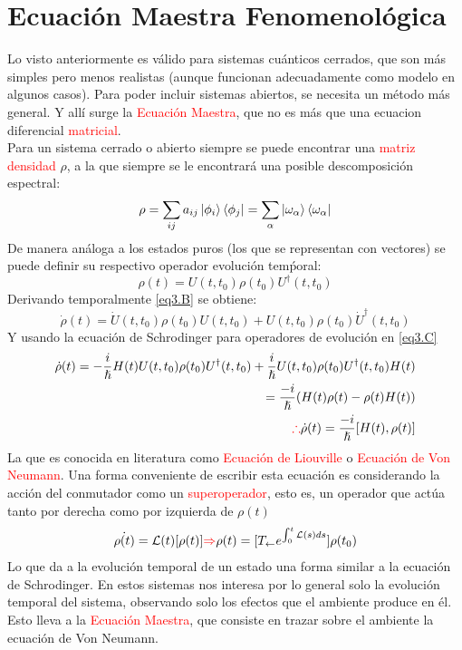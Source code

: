 \documentclass{book}
\begin{document}
\chapter{Ecuación Maestra Fenomenológica}
Lo visto anteriormente es válido para sistemas cuánticos cerrados, que son más simples pero menos realistas (aunque funcionan adecuadamente como modelo en algunos casos). Para poder incluir sistemas abiertos, se necesita un método más general. Y allí surge la \textcolor{red}{Ecuación Maestra}, que no es más que una ecuacion diferencial  \textcolor{red}{matricial}.\\

Para un sistema cerrado o abierto siempre se puede encontrar una \textcolor{red}{matriz densidad} $\rho$, a la que siempre se le encontrará una posible descomposición espectral:
\begin{equation}\label{eq3.A}\rho=\sum_{ij}a_{ij}\ket{\phi_i}\bra{\phi_j}=\sum_\alpha \ket{\omega_\alpha}\bra{\omega_\alpha}\end{equation}
De manera análoga a los estados puros (los que se representan con vectores) se puede definir su respectivo operador evolución temṕoral:
\begin{equation}\label{eq3.B}\rho(t)=U(t,t_0)\rho(t_0)U^\dag(t,t_0)\end{equation}
Derivando temporalmente \ref{eq3.B} se obtiene:
\begin{equation}\label{eq3.C}\dot{\rho}(t)=\dot{U}(t,t_0)\rho(t_0)U(t,t_0)+U(t,t_0)\rho(t_0)\dot{U}^\dag(t,t_0)\end{equation}
Y usando la ecuación de Schrodinger para operadores de evolución en \ref{eq3.C}
\begin{equation}\label{eq3.D}\begin{aligned}\dot{\rho}(t)=-\frac{i}{\hslash} H(t)U(t,t_0)\rho(t_0)U^\dag(t,t_0)+\frac{i}{\hslash} U(t,t_0)\rho(t_0)U^\dag(t,t_0)H(t)\\ = \frac{-i}{\hslash}(H(t)\rho(t)-\rho(t)H(t)) \\ \textcolor{red}{\therefore} \dot{\rho}(t)=\frac{-i}{\hslash}[H(t),\rho(t)]\end{aligned}\end{equation}
La que es conocida en literatura como \textcolor{red}{Ecuación de Liouville} o \textcolor{red}{Ecuación de Von Neumann}.
Una forma conveniente de escribir esta ecuación es considerando la acción del conmutador como un \textcolor{red}{superoperador}, esto es, un operador que actúa tanto por derecha como por izquierda de $\rho(t)$
\begin{equation}\label{eq3.E}\dot{\rho(t)}=\mathcal{L}(t)[\rho(t)]\textcolor{red}{\Rightarrow} \rho(t)=[T_{\leftarrow}e^{\int_{0}^t \mathcal{L}(s) ds}]\rho(t_0)
\end{equation}
Lo que da a la evolución temporal de un estado una forma similar a la ecuación de Schrodinger. En estos sistemas nos interesa por lo general solo la evolución temporal del sistema, observando solo los efectos que el ambiente produce en él. Esto lleva a la \textcolor{red}{Ecuación Maestra}, que consiste en trazar sobre el ambiente la ecuación de Von Neumann.\\
\end{document}

